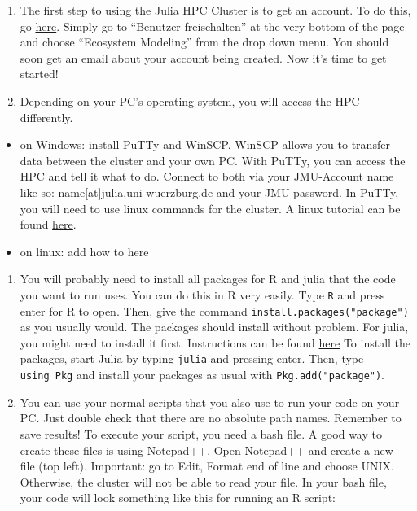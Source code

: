 \documentclass[
]{book}
\begin{document}
\begin{enumerate}
\def\labelenumi{\arabic{enumi}.}
\item
  The first step to using the Julia HPC Cluster is to get an account.
  To do this, go
  \href{https://www.rz.uni-wuerzburg.de/dienste/rzserver/high-performance-computing/}{here}.
  Simply go to ``Benutzer freischalten'' at the very bottom of the page
  and choose ``Ecosystem Modeling'' from the drop down menu. You should
  soon get an email about your account being created. Now it's time to
  get started!
\item
  Depending on your PC's operating system, you will access the HPC
  differently.
\end{enumerate}

\begin{itemize}
\item
  on Windows: install PuTTy and WinSCP. WinSCP allows you to transfer
  data between the cluster and your own PC. With PuTTy, you can access
  the HPC and tell it what to do. Connect to both via your JMU-Account
  name like so: name{[}at{]}julia.uni-wuerzburg.de and your JMU password.
  In PuTTy, you will need to use linux commands for the cluster. A
  linux tutorial can be found
  \href{https://github.com/konrad/Introduction_to_the_Unix_Shell_for_biologists/blob/master/Unix_Shell_Handout.md}{here}.
\item
  on linux: add how to here
\end{itemize}

\begin{enumerate}
\def\labelenumi{\arabic{enumi}.}
\setcounter{enumi}{2}
\item
  You will probably need to install all packages for R and julia that
  the code you want to run uses. You can do this in R very easily.
  Type \texttt{R} and press enter for R to open. Then, give the command
  \texttt{install.packages("package")} as you usually would. The packages
  should install without problem. For julia, you might need to install
  it first. Instructions can be found
  \href{https://github.com/CCTB-Ecomods/server-setup/blob/master/install_julia.sh}{here}
  To install the packages, start Julia by typing \texttt{julia} and pressing
  enter. Then, type \texttt{using\ Pkg} and install your packages as usual
  with \texttt{Pkg.add("package")}.
\item
  You can use your normal scripts that you also use to run your code
  on your PC. Just double check that there are no absolute path names.
  Remember to save results! To execute your script, you need a bash
  file. A good way to create these files is using Notepad++. Open
  Notepad++ and create a new file (top left). Important: go to Edit,
  Format end of line and choose UNIX. Otherwise, the cluster will not
  be able to read your file. In your bash file, your code will look
  something like this for running an R script:
\end{enumerate}
\end{document}
